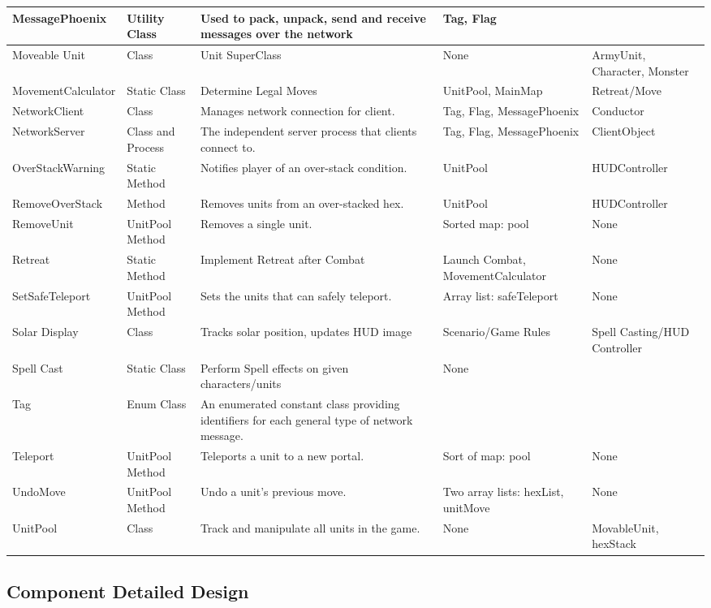 \documentclass[12pt,a4paper,titlepage]{article}
\begin{document}
{\begin{center}
\begin{tabularx}{\linewidth}{|p{1.5in}|X|X|X|X|}
\hline
MessagePhoenix & Utility Class & Used to pack, unpack, send and receive messages over the network & Tag, Flag & \\
\hline
Moveable Unit & Class & Unit SuperClass & None & ArmyUnit, Character, Monster\\
\hline
MovementCalculator & Static Class & Determine Legal Moves & UnitPool, MainMap & Retreat/Move\\
\hline
NetworkClient & Class & Manages network connection for client. & Tag, Flag, MessagePhoenix & Conductor \\
\hline
NetworkServer & Class and Process & The independent server process that clients connect to. & Tag, Flag, MessagePhoenix & ClientObject\\
\hline
OverStackWarning & Static Method & Notifies player of an over-stack condition. & UnitPool & HUDController\\
\hline
RemoveOverStack & Method & Removes units from an over-stacked hex. & UnitPool & HUDController\\
\hline
RemoveUnit & UnitPool Method & Removes a single unit. & Sorted map: pool & None\\
\hline
Retreat & Static Method & Implement Retreat after Combat & Launch Combat, MovementCalculator & None\\
\hline
SetSafeTeleport & UnitPool Method & Sets the units that can safely teleport. & Array list: safeTeleport & None\\
\hline
Solar Display & Class & Tracks solar position, updates HUD image & Scenario/Game Rules & Spell Casting/HUD Controller\\
\hline
Spell Cast & Static Class & Perform Spell effects on given characters/units & None\\
\hline
Tag & Enum Class & An enumerated constant class providing identifiers for each general type of network message. & & \\
\hline
Teleport & UnitPool Method & Teleports a unit to a new portal. & Sort of map: pool & None\\
\hline 
UndoMove & UnitPool Method & Undo a unit's previous move. & Two array lists: hexList, unitMove & None\\
\hline
UnitPool & Class & Track and manipulate all units in the game. & None & MovableUnit, hexStack\\
\hline
\end{tabularx}
\end{center}
}

\subsection{Component Detailed Design}
\end{document}

